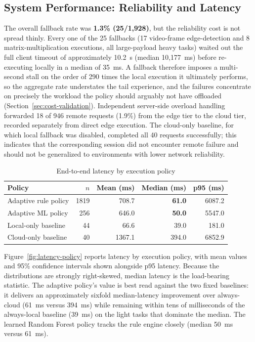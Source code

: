 \subsection{System Performance: Reliability and Latency}
\label{sec:system-performance}

The overall fallback rate was \textbf{1.3\% (25/1{,}928)}, but the reliability
cost is not spread thinly. Every one of the 25 fallbacks (17 video-frame
edge-detection and 8 matrix-multiplication executions, all large-payload heavy
tasks) waited out the full client timeout of approximately 10.2~s (median
10{,}177~ms) before re-executing locally in a median of 35~ms. A fallback
therefore imposes a multi-second stall on the order of 290 times the local
execution it ultimately performs, so the aggregate rate understates the tail
experience, and the failures concentrate on precisely the workload the policy
should arguably not have offloaded (Section~\ref{sec:cost-validation}).
Independent server-side overload handling forwarded 18 of 946 remote requests
(1.9\%) from the edge tier to the cloud tier, recorded separately from direct
edge execution. The cloud-only baseline, for which local fallback was disabled,
completed all 40 requests successfully; this indicates that the corresponding
session did not encounter remote failure and should not be generalized to
environments with lower network reliability.

\begin{table}[t]
\centering
\caption{End-to-end latency by execution policy}
\label{tab:eval-policy-latency}
\footnotesize
\begin{tabular}{lrrrr}
\toprule
Policy & $n$ & Mean (ms) & Median (ms) & p95 (ms) \\
\midrule
Adaptive rule policy & 1819 & 708.7 & \textbf{61.0} & 6087.2 \\
Adaptive ML policy & 256 & 646.0 & \textbf{50.0} & 5547.0 \\
Local-only baseline & 44 & 66.6 & 39.0 & 181.0 \\
Cloud-only baseline & 40 & 1367.1 & 394.0 & 6852.9 \\
\bottomrule
\end{tabular}
\end{table}

Figure~\ref{fig:latency-policy} reports latency by execution policy, with mean
values and 95\% confidence intervals shown alongside p95 latency. Because the
distributions are strongly right-skewed, median latency is the load-bearing
statistic. The adaptive policy's value is best read against the two fixed
baselines: it delivers an approximately sixfold median-latency improvement over
always-cloud (61~ms versus 394~ms) while remaining within tens of milliseconds of
the always-local baseline (39~ms) on the light tasks that dominate the median.
The learned Random Forest policy tracks the rule engine closely (median 50~ms
versus 61~ms).

